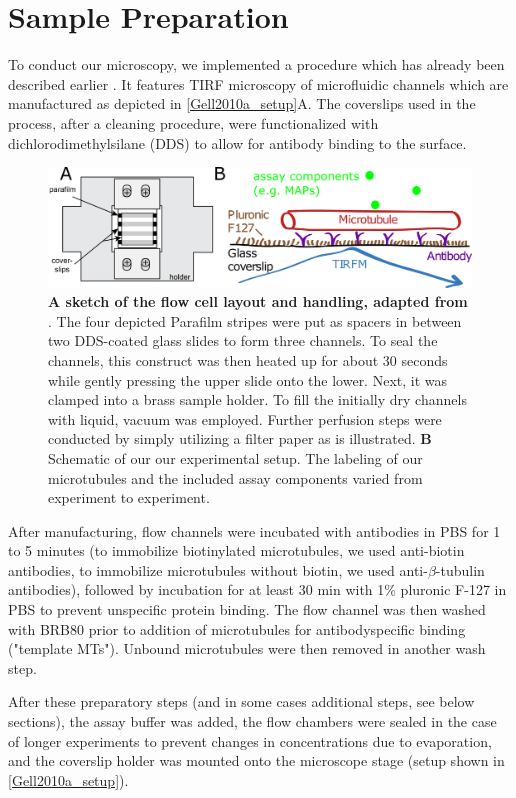 \section{Sample Preparation}
\label{assayPREP}
To conduct our microscopy, we implemented a procedure which has already been described earlier \parencite{Gell2010a}. It features TIRF microscopy of microfluidic channels which are manufactured as depicted in \autoref{Gell2010a_setup}A. The coverslips used in the process, after a cleaning procedure, were functionalized with dichlorodimethylsilane (DDS) to allow for antibody binding to the surface.\par
\begin{figure}[htb]
\centering
\includegraphics[scale=1.1]{Figures/setup.png}
\caption[The flow cell layout and handling, adapted from \parencite{Gell2010a}.]{
		\textbf{A sketch of the flow cell layout and handling, adapted from \parencite{Gell2010a}}. The four depicted Parafilm stripes were put as spacers in between two DDS-coated glass slides to form three channels. To seal the channels, this construct was then heated up for about 30 seconds while gently pressing the upper slide onto the lower. Next, it was clamped into a brass sample holder. To fill the initially dry channels with liquid, vacuum was employed. Further perfusion steps were conducted by simply utilizing a filter paper as is illustrated. \textbf{B} Schematic of our our experimental setup. The labeling of our microtubules and the included assay components varied from experiment to experiment. 
	}\label{Gell2010a_setup}
\end{figure}
After manufacturing, flow channels were incubated with antibodies in PBS for 1 to 5 minutes (to immobilize biotinylated microtubules, we used anti-biotin antibodies, to immobilize microtubules without biotin, we used anti-$\beta$-tubulin antibodies), followed by incubation for at least 30 min with 1\% pluronic F-127 in PBS to prevent unspecific protein binding. The flow channel was then washed with BRB80 prior to addition of microtubules for antibodyspecific binding ("template MTs"). Unbound microtubules were then removed in another wash step.\par
After these preparatory steps (and in some cases additional steps, see below sections), the assay buffer was added, the flow chambers were sealed in the case of longer experiments to prevent changes in concentrations due to evaporation, and the coverslip holder was mounted onto the microscope stage (setup shown in \autoref{Gell2010a_setup}).

